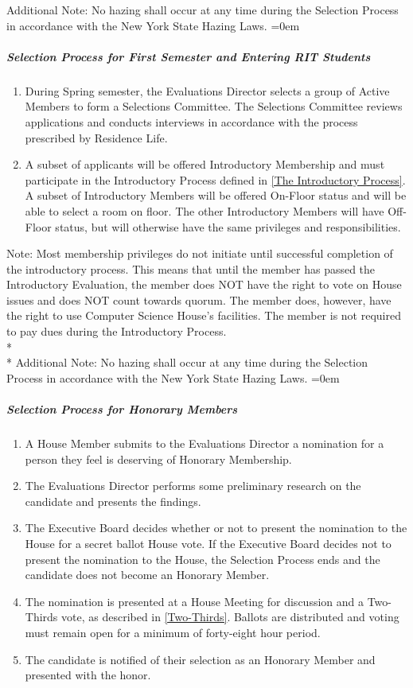 \documentclass{article}
\newcommand{\asubsubsubsection}[1]{\parindent=0em\subparagraph{#1} \label{#1}}
\begin{document}
Additional Note: No hazing shall occur at any time during the Selection Process in accordance with the New York State Hazing Laws.
\asubsubsubsection{Selection Process for First Semester and Entering RIT Students}
\begin{enumerate}
	\item During Spring semester, the Evaluations Director selects a group of Active Members to form a Selections Committee.
		The Selections Committee reviews applications and conducts interviews in accordance with the process prescribed by Residence Life.
        \item A subset of applicants will be offered Introductory Membership and must participate in the Introductory Process defined in \ref{The Introductory Process}. 
            A subset of Introductory Members will be offered On-Floor status and will be able to select a room on floor. 
            The other Introductory Members will have Off-Floor status, but will otherwise have the same privileges and responsibilities.
\end{enumerate}
Note: Most membership privileges do not initiate until successful completion of the introductory process.
This means that until the member has passed the Introductory Evaluation, the member does NOT have the right to vote on House issues and does NOT count towards quorum.
The member does, however, have the right to use Computer Science House's facilities.
The member is not required to pay dues during the Introductory Process.
\\* \\*
Additional Note: No hazing shall occur at any time during the Selection Process in accordance with the New York State Hazing Laws.
\asubsubsubsection{Selection Process for Honorary Members}
\begin{enumerate}
	\item A House Member submits to the Evaluations Director a nomination for a person they feel is deserving of Honorary Membership.
	\item The Evaluations Director performs some preliminary research on the candidate and presents the findings.
	\item The Executive Board decides whether or not to present the nomination to the House for a secret ballot House vote.
		If the Executive Board decides not to present the nomination to the House, the Selection Process ends and the candidate does not become an Honorary Member.
	\item The nomination is presented at a House Meeting for discussion and a Two-Thirds vote, as described in \ref{Two-Thirds}.
		Ballots are distributed and voting must remain open for a minimum of forty-eight hour period.
	\item The candidate is notified of their selection as an Honorary Member and presented with the honor.
\end{enumerate}
\end{document}
